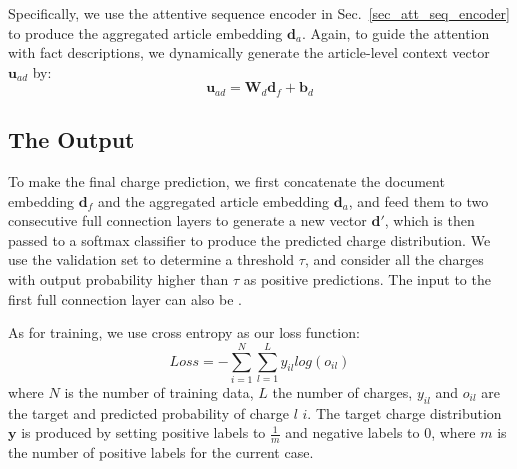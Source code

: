 Specifically, we use the attentive sequence encoder in Sec.~\ref{sec_att_seq_encoder} 
to produce the aggregated article embedding $\mathbf{d}_a$. 
Again, to guide the attention with fact descriptions, we dynamically generate the article-level context vector $\mathbf{u}_{ad}$ by:
\begin{equation}
\mathbf{u}_{ad} = \mathbf{W}_d \mathbf{d}_f + \mathbf{b}_d
\end{equation}


\subsection{The Output}
To make the final charge prediction, we first concatenate the document embedding $\mathbf{d}_f$ and the aggregated article embedding $\mathbf{d}_a$, and feed them to two consecutive full connection layers to generate a new vector $\mathbf{d}'$, which is then passed to a softmax classifier to produce the predicted charge distribution. We use the validation set to determine a threshold $\tau$, and consider all the charges with output probability higher than $\tau$ as positive predictions.
The input to the first full connection layer can also be .

As for training, we use cross entropy as our loss function:
\begin{equation}
\label{original_loss}
Loss= -\sum_{i=1}^N\sum_{l=1}^L{y_{il} log(o_{il})}
\end{equation} 
where $N$ is the number of training data, $L$ the number of charges, $y_{il}$ and $o_{il}$ are the target and predicted probability of charge $l$  $i$. The target charge distribution $\mathbf{y}$ is produced by setting positive labels to $\frac{1}{m}$ and negative labels to $0$, where $m$ is the number of positive labels for the current case.

